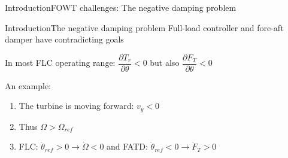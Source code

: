 \begin{frame}{Introduction}{FOWT challenges: The negative damping problem}
\end{frame}


\begin{frame}{Introduction}{The negative damping problem}
	Full-load controller and fore-aft damper have contradicting goals
	
	\smallskip
	In most FLC operating range: $ \dfrac{\partial T_r}{\partial \theta} < 0 $ but also $ \dfrac{\partial F_T}{\partial \theta} < 0 $ 
	
	\smallskip
	An example:
	\begin{enumerate}
		\item The turbine is moving forward: $ v_y < 0 $
		\item Thus $ \Omega > \Omega_{ref} $
		\item FLC: $ \dot \theta_{ref} > 0 \rightarrow \dot \Omega < 0 $ and FATD: $ \dot \theta_{ref} < 0 \rightarrow \dot F_T > 0 $
	\end{enumerate}
	
\end{frame}



%



